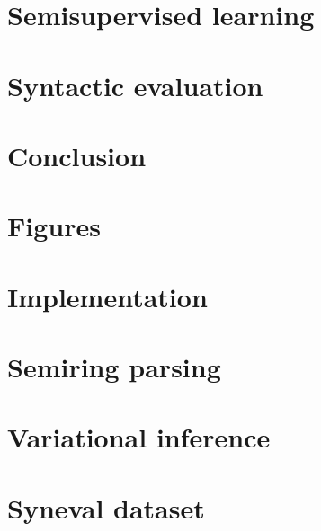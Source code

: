 \documentclass[examplefnt,biber]{../src/nowfnt} %
\begin{document}
\chapter{Semisupervised learning}
\label{05-semisupervised}



\chapter{Syntactic evaluation}
\label{06-syneval}



\chapter{Conclusion}
\label{07-conclusion}



\appendix
\chapter{Figures}
\label{A1-figures}



\chapter{Implementation}
\label{A2-implementation}



\chapter{Semiring parsing}
\label{A3-crf}



\chapter{Variational inference}
\label{A4-vi}



\chapter{Syneval dataset}
\label{A5-syneval}



\printbibliography


\backmatter  %
\end{document}
